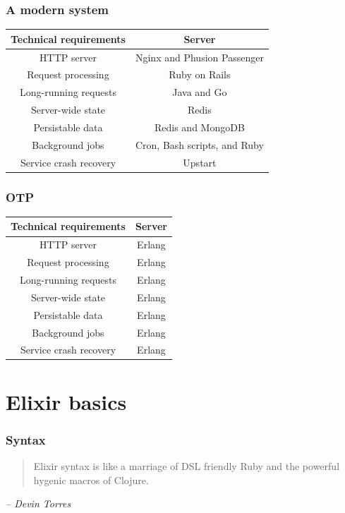 \documentclass{beamer}
\begin{document}
\begin{frame}
  \frametitle{A modern system}
  \begin{center}
    \begin{tabular}{c|c}
      \hline
      Technical requirements & Server \\ \hline
      HTTP server & Nginx and Phusion Passenger \\
      Request processing & Ruby on Rails \\
      Long-running requests & Java and Go \\
      Server-wide state & Redis \\
      Persistable data & Redis and MongoDB \\
      Background jobs & Cron, Bash scripts, and Ruby \\
      Service crash recovery & Upstart \\
      \hline
    \end{tabular}
  \end{center}
\end{frame}

\begin{frame}
  \frametitle{OTP}
  \begin{center}
    \begin{tabular}{c|c}
      \hline
      Technical requirements & Server \\ \hline
      HTTP server & Erlang \\
      Request processing & Erlang \\
      Long-running requests & Erlang \\
      Server-wide state & Erlang \\
      Persistable data & Erlang \\
      Background jobs & Erlang \\
      Service crash recovery & Erlang \\
      \hline
    \end{tabular}
  \end{center}
\end{frame}

\section[Section]{Elixir basics}

\begin{frame}
  \frametitle{Syntax}
  \begin{quote}
  Elixir syntax is like a marriage of DSL
  friendly Ruby and the powerful hygenic macros of Clojure.
  \end{quote}
  \emph{-- Devin Torres}
\end{frame}
\end{document}
